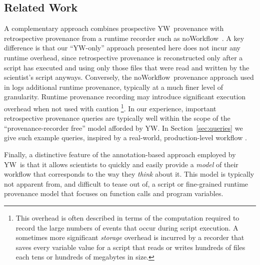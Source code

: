 \documentclass[nocopyrightspace]{sigplanconf}
\newcommand{\NW}{\textsf{noWorkflow}}
\newcommand{\yw}{\textsf{YW}}
\begin{document}
\subsection*{Related Work}
A complementary approach \cite{dey15} combines prospective \yw\
provenance with retrospective provenance from a runtime recorder such
as \NW\ \cite{murta2014nw}. A key difference is that our ``\yw-only''
approach presented here does not incur any runtime overhead, since
retrospective provenance is reconstructed only after a script has
executed and using only those files that were read and written by the
scientist's script anyways. Conversely, the \NW\ provenance approach
used in \cite{dey15} logs additional runtime provenance, typically at
a much finer level of granularity. Runtime provenance recording may
introduce significant execution overhead when not used with
caution \footnote{This overhead is often described in terms of the 
computation required to record the large numbers of events that occur
during script execution.  A sometimes more significant
\emph{storage} overhead is incurred by a recorder that saves every variable
value for a script that reads or writes hundreds of files each tens or hundreds of megabytes
in size.}. In our experience, important retrospective provenance queries
are typically well within the scope of the ``provenance-recorder
free'' model afforded by \yw.  In Section~\ref{sec:queries} we give
such example queries, inspired by a real-world, production-level
workflow \cite{tsai2013autodrug}.

Finally, a distinctive feature of the annotation-based approach
employed by \yw\ is that it allows scientists to quickly and easily
provide a \emph{model} of their workflow that corresponds to the way
they \emph{think} about it. This model is
typically not apparent from, and difficult to tease out of, a script
or fine-grained runtime provenance model that focuses on function
calls and program variables.


\end{document}
